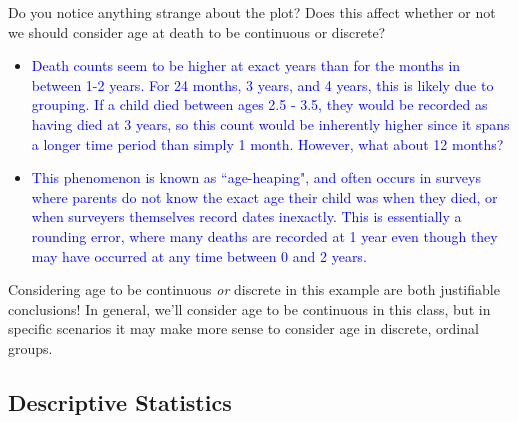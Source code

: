 \documentclass[10pt,t]{beamer}
\begin{document}
\begin{frame}

	
Do you notice anything strange about the plot? Does this affect whether or not we should consider age at death to be continuous or discrete?
	
	\vspace{0.3cm}
	
\begin{itemize}
	\item[] \small \textcolor{blue}{Death counts seem to be higher at exact years than for the months in between 1-2 years. For 24 months, 3 years, and 4 years, this is likely due to grouping. If a child died between ages 2.5 - 3.5, they would be recorded as having died at 3 years, so this count would be inherently higher since it spans a longer time period than simply 1 month. However, what about 12 months?} 
	
	\vspace{0.3cm}
	
	\item[] \small \textcolor{blue}{This phenomenon is known as ``age-heaping", and often occurs in surveys where parents do not know the exact age their child was when they died, or when surveyers themselves record dates inexactly. This is essentially a rounding error, where many deaths are recorded at 1 year even though they may have occurred at any time between 0 and 2 years. }
\end{itemize}	
	
	

	\vspace{0.3cm}

Considering age to be continuous \textit{or} discrete in this example are both justifiable conclusions! In general, we'll consider age to be continuous in this class, but in specific scenarios it may make more sense to consider age in discrete, ordinal groups.

\end{frame}

\subsection{Descriptive Statistics}
\end{document}
